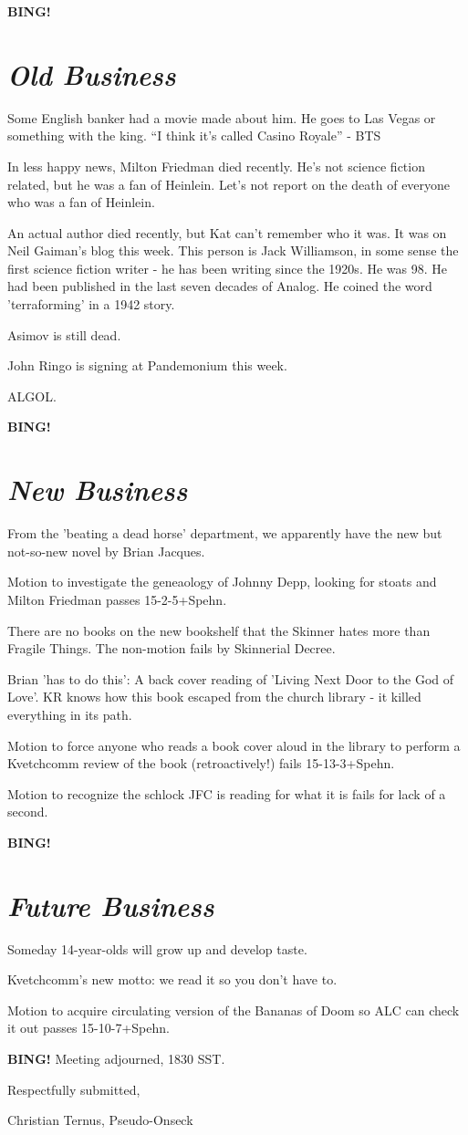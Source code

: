 \documentclass[10pt]{article}
\newcommand{\bing}{{\bf BING!} }
\newcommand{\goto}[1]{\bing \vskip 12pt \section*{{\em{#1}}}}
\begin{document}
 

\goto{Old Business}

Some English banker had a movie made about him. He goes to Las Vegas or something with the king. ``I think it's called Casino Royale'' - BTS

In less happy news, Milton Friedman died recently. He's not science fiction related, but he was a fan of Heinlein. Let's not report on the death of everyone who was a fan of Heinlein.

An actual author died recently, but Kat can't remember who it was. It was on Neil Gaiman's blog this week. This person is Jack Williamson, in some sense the first science fiction writer - he has been writing since the 1920s. He was 98. He had been published in the last seven decades of Analog. He coined the word 'terraforming' in a 1942 story. 

Asimov is still dead.

John Ringo is signing at Pandemonium this week. 

ALGOL.

\goto{New Business}

From the 'beating a dead horse' department, we apparently have the new but not-so-new novel by Brian Jacques. 

Motion to investigate the geneaology of Johnny Depp, looking for stoats and Milton Friedman passes 15-2-5+Spehn.

There are no books on the new bookshelf that the Skinner hates more than Fragile Things. The non-motion fails by Skinnerial Decree.

Brian 'has to do this': A back cover reading of 'Living Next Door to the God of Love'. KR knows how this book escaped from the church library - it killed everything in its path. 

Motion to force anyone who reads a book cover aloud in the library to perform a Kvetchcomm review of the book (retroactively!) fails 15-13-3+Spehn.

Motion to recognize the schlock JFC is reading for what it is fails for lack of a second.

\goto{Future Business}

Someday 14-year-olds will grow up and develop taste.

Kvetchcomm's new motto: we read it so you don't have to.

Motion to acquire circulating version of the Bananas of Doom so ALC can check it out passes 15-10-7+Spehn.

\bing
\noindent
Meeting adjourned, 1830 SST.

\vspace{18pt}



\centerline{Respectfully submitted,}
\centerline{Christian Ternus, Pseudo-Onseck}
\end{document}
